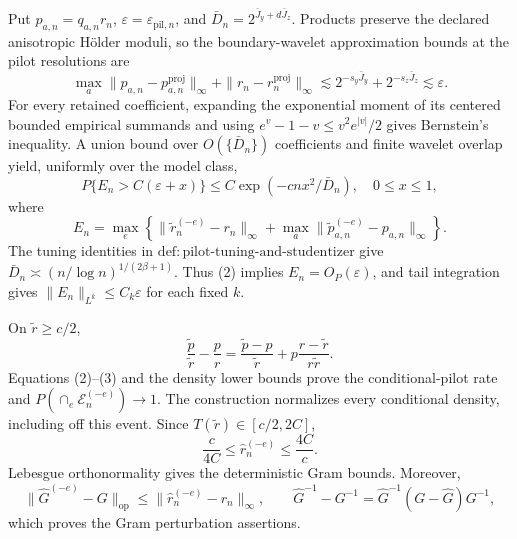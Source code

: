 Put \(p_{a,n}=q_{a,n}r_n\), \(\varepsilon=\varepsilon_{\mathrm{pil},n}\), and \(\bar D_n=2^{\bar J_y+d\bar J_z}\). Products preserve the declared anisotropic H\"older moduli, so the boundary-wavelet approximation bounds at the pilot resolutions are
\[
\max_a\|p_{a,n}-p_{a,n}^{\mathrm{proj}}\|_\infty
+\|r_n-r_n^{\mathrm{proj}}\|_\infty
\lesssim2^{-s_y\bar J_y}+2^{-s_z\bar J_z}\lesssim\varepsilon.   \tag{1}
\]
For every retained coefficient, expanding the exponential moment of its centered bounded empirical summands and using \(e^v-1-v\le v^2e^{|v|}/2\) gives Bernstein's inequality. A union bound over \(O(\{\bar D_n\})\) coefficients and finite wavelet overlap yield, uniformly over the model class,
\[
P\{E_n>C(\varepsilon+x)\}\le C\exp(-cnx^2/\bar D_n),
\quad 0\le x\le1,                                                \tag{2}
\]
where
\[
E_n=\max_e\left\{\|\widetilde r_n^{(-e)}-r_n\|_\infty
+\max_a\|\widetilde p_{a,n}^{(-e)}-p_{a,n}\|_\infty\right\}.
\]
The tuning identities in \(\mathrm{def{:}pilot\text{-}tuning\text{-}and\text{-}studentizer}\) give \(\bar D_n\asymp(n/\log n)^{1/(2\beta+1)}\). Thus (2) implies \(E_n=O_P(\varepsilon)\), and tail integration gives \(\|E_n\|_{L^k}\le C_k\varepsilon\) for each fixed \(k\).

On \(\widetilde r\ge c/2\),
\[
\frac{\widetilde p}{\widetilde r}-\frac pr
=\frac{\widetilde p-p}{\widetilde r}
+p\frac{r-\widetilde r}{r\widetilde r}.                          \tag{3}
\]
Equations (2)--(3) and the density lower bounds prove the conditional-pilot rate and \(P(\cap_e\mathcal E_n^{(-e)})\to1\). The construction normalizes every conditional density, including off this event. Since \(T(\widetilde r)\in[c/2,2C]\),
\[
\frac c{4C}\le\widehat r_n^{(-e)}\le\frac{4C}{c}.              \tag{4}
\]
Lebesgue orthonormality gives the deterministic Gram bounds. Moreover,
\[
\|\widehat G^{(-e)}-G\|_{\mathrm{op}}
\le\|\widehat r_n^{(-e)}-r_n\|_\infty,
\qquad
\widehat G^{-1}-G^{-1}=\widehat G^{-1}(G-\widehat G)G^{-1},      \tag{5}
\]
which proves the Gram perturbation assertions.


